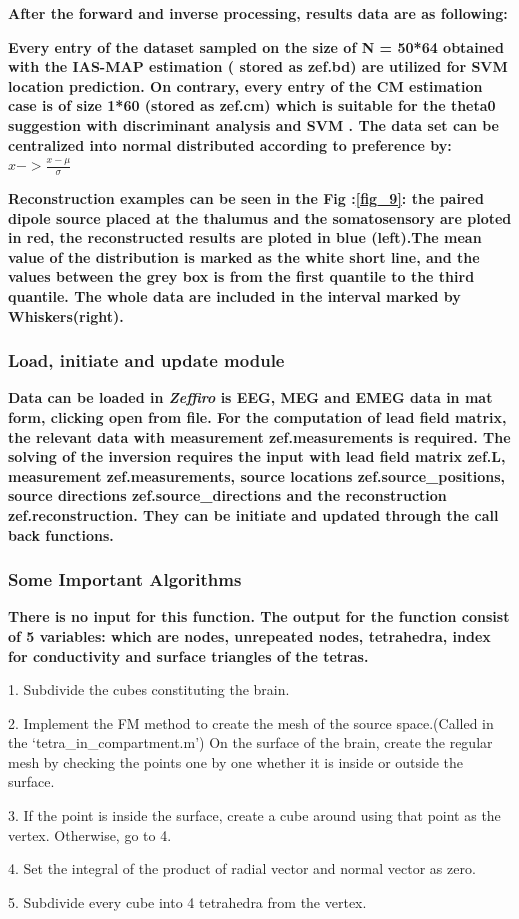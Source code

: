 \documentclass[5p]{elsarticle}
\begin{document}
\begin{frontmatter}
\bf After the forward and inverse processing, results data are as following:

\bf Every entry of the dataset sampled on the size of N = 50*64 obtained with the IAS-MAP estimation ( stored as zef.bd) are utilized for SVM location prediction. On contrary, every entry of the CM estimation case is of size 1*60 (stored as zef.cm) which is suitable for the theta0 suggestion  with discriminant analysis and SVM .
The data set can be centralized into normal distributed according to preference by:
$x -> \frac{x-\mu}{\sigma}$
 
\bf Reconstruction examples can be seen in the Fig :\ref{fig_9}: the paired dipole source placed at the thalumus and the somatosensory are ploted in red, the reconstructed results are ploted in blue (left).The mean value of the distribution is marked as the white short line, and the values between the grey box is from the first quantile to the third quantile. The whole data are included in the interval marked by Whiskers(right).


\subsubsection{Load, initiate and update module}
\bf Data can be loaded in {\em Zeffiro} is EEG, MEG and EMEG data in mat form, clicking open from file. For the computation of lead field matrix, the relevant data with measurement zef.measurements is required. The solving of the inversion requires the input with lead field matrix zef.L, measurement zef.measurements, source locations zef.source\_positions, source directions zef.source\_directions and the reconstruction zef.reconstruction.
They can be initiate and updated through the call back functions.

\subsubsection{Some Important Algorithms}
\bf There is no input for this function. The output for the function consist of 5 variables: which are nodes, unrepeated nodes, tetrahedra, index for conductivity and surface triangles of the tetras.
\item 1. Subdivide the cubes constituting the brain.
\item 2. Implement the FM method to create the mesh of the source space.(Called in the ‘tetra\_in\_compartment.m’) On the surface of the brain, create the regular mesh by checking the points one by one whether it is inside or outside the surface.
\item 3. If the point is inside the surface, create a cube around using that point as the vertex. Otherwise, go to 4.
\item 4. Set the integral of the product of radial vector and normal vector as zero.
\item 5. Subdivide every cube into 4 tetrahedra from the vertex.


\end{frontmatter}
\end{document}
